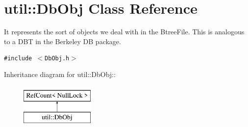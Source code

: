 \hypertarget{classutil_1_1DbObj}{
\section{util::DbObj Class Reference}
\label{classutil_1_1DbObj}
}
It represents the sort of objects we deal with in the BtreeFile. This is analogous to a DBT in the Berkeley DB package.  


{\tt \#include $<$DbObj.h$>$}

Inheritance diagram for util::DbObj::\begin{figure}[H]
\begin{center}
\leavevmode
\includegraphics[height=2cm]{classutil_1_1DbObj}
\end{center}
\end{figure}
